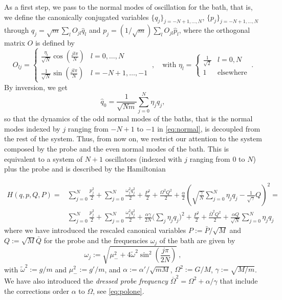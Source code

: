 \documentclass[11pt]{article}
\numberwithin{equation}{section}
\def\red{\textcolor{red}}
\def\red{}
\numberwithin{theorem}{section}
\def\tilde#1{\widetilde{#1}}
\def\sp{g}
\def\Sp{G}
\begin{document}
As a first step, we pass to the normal modes of oscillation for the bath, that is, we define the canonically conjugated
variables $\{q_j\}_{j=-N+1,\ldots,N}$, $\{p_j\}_{j=-N+1,\ldots,N}$ through $q_j=\sqrt m\sum_lO_{jl}\hat q_l$ and
$p_j=\left(1/\sqrt m\right)\sum_lO_{jl}\hat p_l$, where the orthogonal matrix $O$ is defined by %
\begin{equation}\label{eq:normal}
O_{lj}= \left\{\begin{array}{cc}
\frac{\eta_l}{\sqrt N}\cos \left(\frac{jl\pi}{N}\right)& l=0,\ldots,N\\
\frac{1}{\sqrt N}\sin \left(\frac{jl\pi}{N}\right)& l=-N+1,\ldots,-1
\end{array}
\right.\ , \quad \mbox{with }\eta_l=\left\{\begin{array}{cc}\frac1{\sqrt2}&
l=0,N\\
1& \mbox{elsewhere}\end{array}\right.\ .
\end{equation}
By inversion, we get
\[
\hat q_0=\frac1{\sqrt{Nm}} \sum_{j=0}^N\eta_j q_j,
\]
so that the dynamics of the odd normal modes of the baths, that is the normal modes indexed by $j$ ranging from $-N+1$
to $-1$ in \eqref{eq:normal}, is decoupled from the rest of the system. Thus, from now on, we restrict our attention to
the system composed by the probe and the even normal modes of the bath. This is equivalent to a system of $N+1$
oscillators (indexed with $j$ ranging from 0 to $N$) plus the probe and is described by the Hamiltonian

\begin{align}\label{eq:Ham1}
H(q,p,Q,P)=&\sum_{j=0}^{N} \frac{p_j^2}2 + \sum_{j=0}^{N} \frac{\omega_j^2 
q_j^2}2 + \frac{P^2}2+\frac{\Omega^2Q^2}2 +
\frac\alpha{2}\left(\sqrt{\frac{\gamma}{N}}\sum_{j=0}^N \eta_j q_j-
\frac1{\sqrt\gamma}Q\right)^2=\\
&\red{\sum_{j=0}^{N} \frac{p_j^2}2 + \sum_{j=0}^{N} \frac{\omega_j^2 
	q_j^2}2 + \frac{\alpha\gamma}{2N}\biggl(\sum_j \eta_j q_j\biggr)^2+ \frac{P^2}2+\frac{\overline \Omega^2Q^2}2 +
\frac{\alpha Q}{\sqrt N}\sum_{j=0}^N \eta_j q_j}\label{eq:Ham1.1}
\end{align}
where we have introduced the rescaled canonical variables $P:=\bar P/\sqrt M$ and $Q:=\sqrt M \bar Q$ for the probe and 
the frequencies $\omega_j$ of the bath are given by
\begin{equation}\label{eq:frequenze_catena}
\omega_j :=
\sqrt{\mu_-^2+4\tilde\omega^2\sin^2\left(\frac{j\pi}{2N}\right)}\ ,
\end{equation}
with $\tilde\omega^2:=\sp/m$ and $\mu_-^2:=\sp'/m$, and $\alpha:=\alpha'/\sqrt {mM}$, $\Omega^2:=\Sp/M$, $\gamma :=
\sqrt{M/m}$. \red{We have also introduced the {\it dressed probe frequency} 
$\overline \Omega^2=\Omega^2 +\alpha/\gamma$ that include the corrections order $\alpha$ to $\Omega$, 
see 
\eqref{eq:polone}.}
\end{document}
